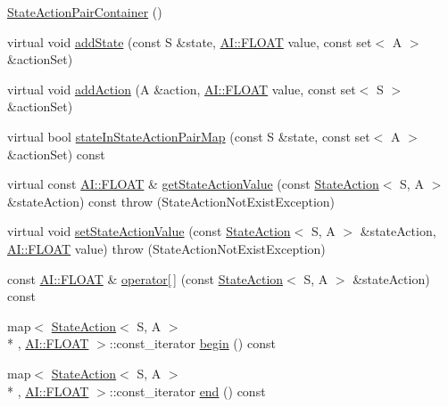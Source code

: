\begin{DoxyCompactItemize}
\item 
\hyperlink{classAI_1_1StateActionPairContainer_a6b6a773f9ef9e474f879dea4de5d109b}{State\+Action\+Pair\+Container} ()
\item 
virtual void \hyperlink{classAI_1_1StateActionPairContainer_a12842518174d0af5fc89c7a86e766099}{add\+State} (const S \&state, \hyperlink{namespaceAI_a41b74884a20833db653dded3918e05c3}{A\+I\+::\+F\+L\+O\+A\+T} value, const set$<$ A $>$ \&action\+Set)
\item 
virtual void \hyperlink{classAI_1_1StateActionPairContainer_af4c9faef1c7d4e35b11f95b8a84352ae}{add\+Action} (A \&action, \hyperlink{namespaceAI_a41b74884a20833db653dded3918e05c3}{A\+I\+::\+F\+L\+O\+A\+T} value, const set$<$ S $>$ \&action\+Set)
\item 
virtual bool \hyperlink{classAI_1_1StateActionPairContainer_a4da559c1dafe0c368a331c47aede0490}{state\+In\+State\+Action\+Pair\+Map} (const S \&state, const set$<$ A $>$ \&action\+Set) const 
\item 
virtual const \hyperlink{namespaceAI_a41b74884a20833db653dded3918e05c3}{A\+I\+::\+F\+L\+O\+A\+T} \& \hyperlink{classAI_1_1StateActionPairContainer_aa3dccc9c82a2ec4130050c832e3da6c9}{get\+State\+Action\+Value} (const \hyperlink{classAI_1_1StateAction}{State\+Action}$<$ S, A $>$ \&state\+Action) const   throw (\+State\+Action\+Not\+Exist\+Exception)
\item 
virtual void \hyperlink{classAI_1_1StateActionPairContainer_a26fa5b9fd043865695e6c4adf97188d5}{set\+State\+Action\+Value} (const \hyperlink{classAI_1_1StateAction}{State\+Action}$<$ S, A $>$ \&state\+Action, \hyperlink{namespaceAI_a41b74884a20833db653dded3918e05c3}{A\+I\+::\+F\+L\+O\+A\+T} value)  throw (\+State\+Action\+Not\+Exist\+Exception)
\item 
const \hyperlink{namespaceAI_a41b74884a20833db653dded3918e05c3}{A\+I\+::\+F\+L\+O\+A\+T} \& \hyperlink{classAI_1_1StateActionPairContainer_a4dc529e9a2fa432e93fe4e4d083fce6e}{operator\mbox{[}$\,$\mbox{]}} (const \hyperlink{classAI_1_1StateAction}{State\+Action}$<$ S, A $>$ \&state\+Action) const 
\item 
map$<$ \hyperlink{classAI_1_1StateAction}{State\+Action}$<$ S, A $>$\\*
, \hyperlink{namespaceAI_a41b74884a20833db653dded3918e05c3}{A\+I\+::\+F\+L\+O\+A\+T} $>$\+::const\+\_\+iterator \hyperlink{classAI_1_1StateActionPairContainer_abb152cc2644ba6fad1da5476b746dd30}{begin} () const 
\item 
map$<$ \hyperlink{classAI_1_1StateAction}{State\+Action}$<$ S, A $>$\\*
, \hyperlink{namespaceAI_a41b74884a20833db653dded3918e05c3}{A\+I\+::\+F\+L\+O\+A\+T} $>$\+::const\+\_\+iterator \hyperlink{classAI_1_1StateActionPairContainer_a36cb0d1278cd67b4a7b4967ef6740937}{end} () const 
\end{DoxyCompactItemize}
